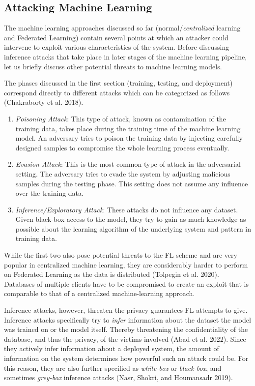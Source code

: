\hypertarget{attacking-machine-learning}{%
\subsection{Attacking Machine
Learning}\label{attacking-machine-learning}}

The machine learning approaches discussed so far
(normal/\emph{centralized} learning and Federated Learning) contain
several points at which an attacker could intervene to exploit various
characteristics of the system. Before discussing inference attacks that
take place in later stages of the machine learning pipeline, let us
briefly discuss other potential threats to machine learning models.

The phases discussed in the first section (training, testing, and
deployment) correspond directly to different attacks which can be
categorized as follows (Chakraborty et al. 2018).

\begin{enumerate}
\def\labelenumi{\arabic{enumi}.}
\tightlist
\item
  \emph{Poisoning Attack}: This type of attack, known as contamination
  of the training data, takes place during the training time of the
  machine learning model. An adversary tries to poison the training data
  by injecting carefully designed samples to compromise the whole
  learning process eventually.
\item
  \emph{Evasion Attack}: This is the most common type of attack in the
  adversarial setting. The adversary tries to evade the system by
  adjusting malicious samples during the testing phase. This setting
  does not assume any influence over the training data.
\item
  \emph{Inference/Exploratory Attack}: These attacks do not influence
  any dataset. Given black-box access to the model, they try to gain as
  much knowledge as possible about the learning algorithm of the
  underlying system and pattern in training data.
\end{enumerate}

While the first two also pose potential threats to the FL scheme and are
very popular in centralized machine learning, they are considerably
harder to perform on Federated Learning as the data is distributed
(Tolpegin et al. 2020). Databases of multiple clients have to be
compromised to create an exploit that is comparable to that of a
centralized machine-learning approach.

Inference attacks, however, threaten the privacy guarantees FL attempts
to give. Inference attacks specifically try to \emph{infer} information
about the dataset the model was trained on or the model itself. Thereby
threatening the confidentiality of the database, and thus the privacy,
of the victims involved (Abad et al. 2022). Since they actively infer
information about a deployed system, the amount of information on the
system determines how powerful such an attack could be. For this reason,
they are also further specified as \emph{white-box} or \emph{black-box},
and sometimes \emph{grey-box} inference attacks (Nasr, Shokri, and
Houmansadr 2019).


